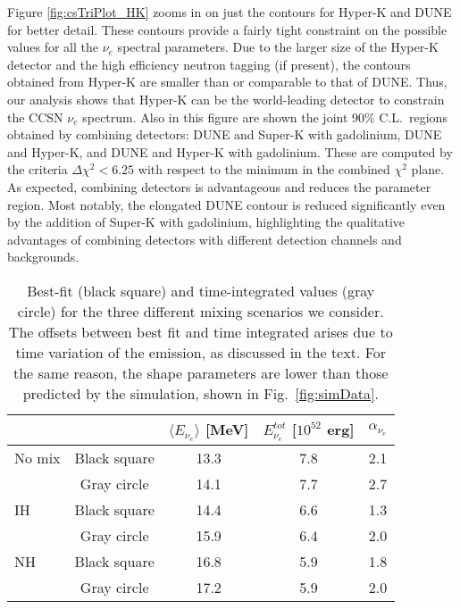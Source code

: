 \documentclass[aps,reprint,superscriptaddress]{revtex4-1}
\begin{document}
Figure \ref{fig:csTriPlot_HK} zooms in on just the contours for Hyper-K and DUNE for better detail. These contours provide a fairly tight constraint on the possible values for all the $\nu_e$ spectral parameters.  Due to the larger size of the Hyper-K detector and the high efficiency neutron tagging (if present), the contours obtained from Hyper-K are smaller than or comparable to that of DUNE.  Thus, our analysis shows that Hyper-K can be the world-leading detector to constrain the  CCSN  $\nu_e$ spectrum. Also in this figure are shown the joint 90\% C.L.~regions obtained by combining detectors: DUNE and Super-K with gadolinium, DUNE and Hyper-K, and DUNE and Hyper-K with gadolinium. These are computed by the criteria $\Delta \chi^2 < 6.25$ with respect to the minimum in the combined $\chi^2$ plane. As expected, combining detectors is advantageous and reduces the parameter region. Most notably, the elongated DUNE contour is reduced significantly even by the addition of Super-K with gadolinium, highlighting the qualitative advantages of combining detectors with different detection channels and backgrounds. 

\begin{table}
\centering
\begin{tabular}{lcccc}
\hline \hline
& & $\langle E_{\nu_e}\rangle$ [MeV] & $E_{\nu_e}^{tot}$ [$10^{52}$ erg] & $\alpha_{\nu_e}$ \\ \hline 
No mix & Black square & 13.3 & 7.8 & 2.1 \\ 
& Gray circle & 14.1 & 7.7 & 2.7 \\ \hline 
IH & Black square & 14.4 & 6.6 & 1.3 \\ 
& Gray circle & 15.9 & 6.4 & 2.0 \\ \hline 
NH & Black square & 16.8 & 5.9 & 1.8 \\ 
& Gray circle & 17.2 & 5.9 & 2.0 \\ \hline \hline
\end{tabular}
\caption{Best-fit (black square) and time-integrated values (gray circle) for the three different mixing scenarios we consider. The offsets between best fit and time integrated arises due to time variation of the emission, as discussed in the text. For the same reason, the shape parameters are lower than those predicted by the simulation, shown in Fig.~\ref{fig:simData}.}
\label{tab:bestFitValues}
\end{table}
\end{document}
